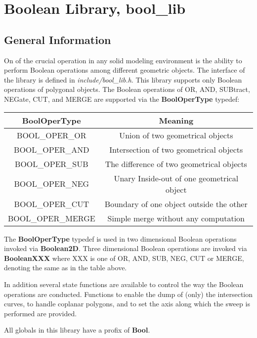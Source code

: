 \chapter{Boolean Library, bool\_lib}

\section{General Information}

On of the crucial operation in any solid modeling environment is the
ability to perform Boolean operations among different geometric
objects.  The interface of the library is defined in {\em
include/bool\_lib.h}. This library supports only Boolean operations of
polygonal objects. The Boolean operations of OR, AND, SUBtract,
NEGate, CUT, and MERGE are supported via the {\bf BoolOperType}
typedef:
\begin{center}
\begin{tabular}{||c|c||} \hline 
    BoolOperType & Meaning \\ \hline
    BOOL\_OPER\_OR & Union of two geometrical objects \\
    BOOL\_OPER\_AND & Intersection of two geometrical objects \\
    BOOL\_OPER\_SUB & The difference of two geometrical objects \\
    BOOL\_OPER\_NEG & Unary Inside-out of one geometrical object \\
    BOOL\_OPER\_CUT & Boundary of one object outside the other \\
    BOOL\_OPER\_MERGE & Simple merge without any computation \\ \hline
\end{tabular}
\end{center}

The {\bf BoolOperType} typedef is used in two dimensional Boolean operations
invoked via {\bf Boolean2D}. Three dimensional Boolean operations are
invoked via {\bf BooleanXXX} where XXX is one of OR, AND, SUB, NEG, CUT
or MERGE, denoting the same as in the table above.

In addition several state functions are available to control the way
the Boolean operations are conducted. Functions to enable the dump of
(only) the intersection curves, to handle coplanar polygons, and to
set the axis along which the sweep is performed are provided.

All globals in this library have a profix of {\bf Bool}.

